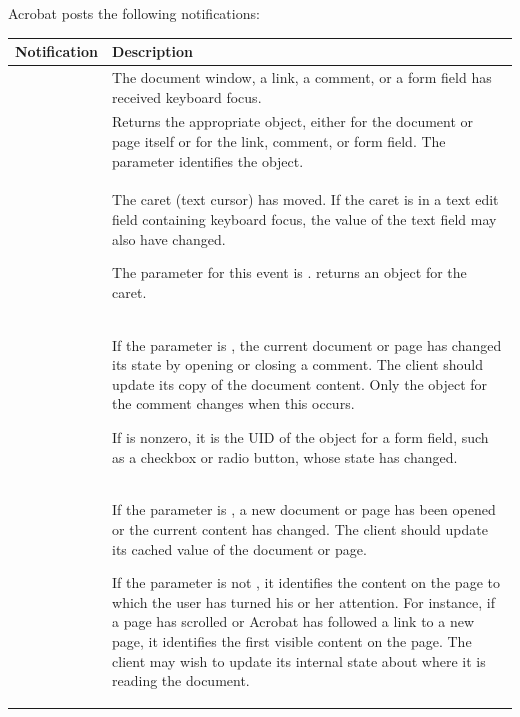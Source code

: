 \documentclass[letterpaper,12pt,english,openany,oneside]{sphinxmanual}
\begin{document}
Acrobat posts the following  notifications:


\begin{savenotes}\sphinxattablestart
\centering
\begin{tabulary}{\linewidth}[t]{|T|T|}
\hline
\sphinxstyletheadfamily 
Notification
&\sphinxstyletheadfamily 
Description
\\
\hline
{}
&
The document window, a link, a comment, or a form field has received keyboard focus.
\\
\hline
{}
&
Returns the appropriate  object, either for the document or page itself or for the link, comment, or form field. The  parameter identifies the object.
\\
\hline
{}
&
The caret (text cursor) has moved. If the caret is in a text edit field containing keyboard focus, the value of the text field may also have changed.

The  parameter for this event is  .  returns an  object for the caret.
\\
\hline
{}
&
If the  parameter is  , the current document or page has changed its state by opening or closing a comment. The client should update its copy of the document content. Only the  object for the comment changes when this occurs.

If  is non\sphinxhyphen{}zero, it is the UID of the  object for a form field, such as a checkbox or radio button, whose state has changed.
\\
\hline
{}
&
If the  parameter is  , a new document or page has been opened or the current content has changed. The client should update its cached value of the document or page.

If the  parameter is not  , it identifies the content on the page to which the user has turned his or her attention. For instance, if a page has scrolled or Acrobat has followed a link to a new page, it identifies the first visible content on the page. The client may wish to update its internal state about where it is reading the document.
\\
\hline
\end{tabulary}
\par
\sphinxattableend\end{savenotes}
\end{document}
